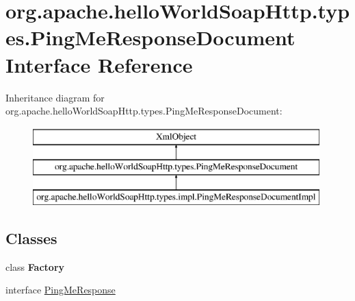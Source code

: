 \hypertarget{interfaceorg_1_1apache_1_1hello_world_soap_http_1_1types_1_1_ping_me_response_document}{}\section{org.\+apache.\+hello\+World\+Soap\+Http.\+types.\+Ping\+Me\+Response\+Document Interface Reference}
\label{interfaceorg_1_1apache_1_1hello_world_soap_http_1_1types_1_1_ping_me_response_document}
Inheritance diagram for org.\+apache.\+hello\+World\+Soap\+Http.\+types.\+Ping\+Me\+Response\+Document\+:\begin{figure}[H]
\begin{center}
\leavevmode
\includegraphics[height=3.000000cm]{interfaceorg_1_1apache_1_1hello_world_soap_http_1_1types_1_1_ping_me_response_document}
\end{center}
\end{figure}
\subsection*{Classes}
\begin{DoxyCompactItemize}
\item 
class {\bfseries Factory}
\item 
interface \hyperlink{interfaceorg_1_1apache_1_1hello_world_soap_http_1_1types_1_1_ping_me_response_document_1_1_ping_me_response}{Ping\+Me\+Response}
\end{DoxyCompactItemize}
